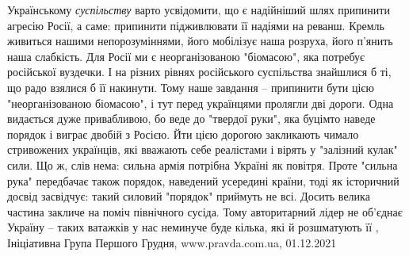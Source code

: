 Українському \emph{суспільству} варто усвідомити, що є надійніший шлях припинити
агресію Росії, а саме: припинити підживлювати її надіями на реванш.  Кремль
живиться нашими непорозуміннями, його мобілізує наша розруха, його п’янить наша
слабкість. Для Росії ми є неорганізованою "біомасою", яка потребує російської
вуздечки. І на різних рівнях російського суспільства знайшлися б ті, що радо
взялися б її накинути.  Тому наше завдання – припинити бути цією
"неорганізованою біомасою", і тут перед українцями пролягли дві дороги.  Одна
видається дуже привабливою, бо веде до "твердої руки", яка буцімто наведе
порядок і виграє двобій з Росією. Йти цією дорогою закликають чимало
стривожених українців, які вважають себе реалістами і вірять у "залізний кулак"
сили. Що ж, слів нема: сильна армія потрібна Україні як повітря. Проте "сильна
рука" передбачає також порядок, наведений усередині країни, тоді як історичний
досвід засвідчує: такий силовий "порядок" приймуть не всі. Досить велика
частина закличе на поміч північного сусіда. Тому авторитарний лідер не об’єднає
Україну – таких ватажків у нас неминуче буде кілька, які й розшматують її
, 
Ініціативна Група Першого Грудня, www.pravda.com.ua, 01.12.2021
